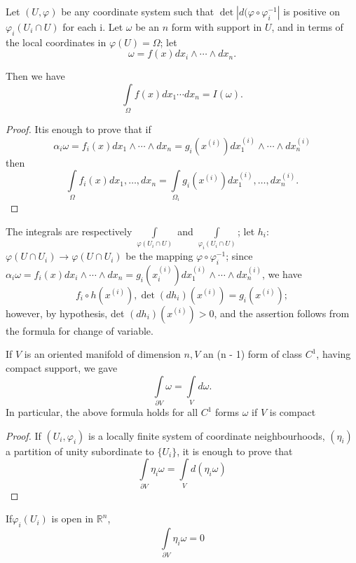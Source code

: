 \setcounter{lemma}{0}
\begin{lemma}\label{chap2:sec5:lem1}
  Let $(U, \varphi)$ be any coordinate system such that $\det |d (
  \varphi \circ \varphi^{-1}_i|$ is positive on $\varphi_i (U_i \cap U)$
  for each i. Let $\omega$ be an $n$ form with support in $U$, and
  in terms of the local coordinates in $\varphi (U) = \Omega $; let 
  $$
  \omega = f(x) dx_i \wedge \cdots \wedge dx_n.
  $$
\end{lemma}

Then we have
$$
\int \limits_{\Omega} f(x) dx_1 \cdots dx_n = I(\omega).
$$

\begin{proof}
  It\pageoriginale is enough to prove that if
  $$
  \alpha_i \omega = f_i (x) dx_1 \wedge \cdots \wedge dx_n = g_i
  (x^{(i)})  dx^{(i)}_1 \wedge \cdots \wedge dx^{(i)}_n 
  $$
  then
  $$
  \int \limits_{\Omega} f_i (x) dx_1, \ldots , dx_n = \int
  \limits_{\Omega_i} g_i (x^{(i)}) dx^{(i)}_1, \ldots , dx^{(i)}_n. 
  $$
\end{proof}

The integrals are respectively $\int \limits_{\varphi (U_i \cap U)}$
and $\int \limits_{\varphi_i (U_i \cap U)}$; let $h_i$: $\varphi (U
\cap U_i) \to \varphi (U \cap U_i)$ be the mapping $\varphi \circ
\varphi^{-1}_i$; since $\alpha_i \omega = f_i (x) dx_i \wedge \cdots
\wedge dx_n = g_i(x^{(i)}_i) dx^{(i)}_1 \wedge \cdots \wedge
dx^{(i)}_n$, we have 
$$
f_i \circ h(x^{(i)}), \det (dh_i) (x^{(i)}) = g_i (x^{(i)});
$$
however, by hypothesis, det $(dh_i) (x^{(i)}) > 0$, and the assertion
follows from the formula for change of variable. 

\begin{theorem}\label{chap2:sec5:thm2}%
  If $V$ is an oriented manifold of
  dimension $n, V$ an (n - 1) form of class $C^1$, having compact
  support, we gave 
  $$
  \int \limits_{\partial V} \omega = \int \limits_{V} d \omega.
  $$
  In particular, the above formula holds for all $C^1$ forms $\omega$
  if $V$ is compact  
\end{theorem}

\begin{proof}
  If $(U_i, \varphi_i)$ is a locally finite system of coordinate
  neighbourhoods, $(\eta_i)$ a partition of unity subordinate to $\{
  U_i\}$, it is enough to prove that 
  $$
  \int \limits_{\partial V} \eta_i \omega = \int \limits_V d (\eta_i \omega)
  $$
\end{proof}

\begin{romancase}\label{chap2:sec5:caseI} %
  If\pageoriginale $\varphi_i (U_i)$ is open in $\mathbb{R}^n$,
  $$
  \int \limits_{\partial V} \eta_i \omega = 0
  $$
\end{romancase}

